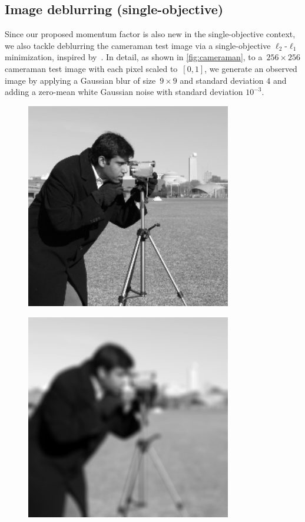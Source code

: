 \documentclass[../main]{subfiles}
\begin{document}
\subsection{Image deblurring (single-objective)}
Since our proposed momentum factor is also new in the single-objective context, we also tackle deblurring the cameraman test image via a single-objective $\ell_2$-$\ell_1$ minimization, inspired by~\cite{Beck2009}.
In detail, as shown in \cref{fig:cameraman}, to a~$256 \times 256$ cameraman test image with each pixel scaled to~$[0,1]$, we generate an observed image by applying a Gaussian blur of size~$9 \times 9$ and standard deviation $4$ and adding a zero-mean white Gaussian noise with standard deviation $10^{-3}$.
\begin{figure}[htpb]
    \centering
    \begin{minipage}[b]{.45\hsize}
        \centering
        \includegraphics[width=0.8\textwidth]{figs/cameraman_original.png}
        \label{fig:cameraman:original}
    \end{minipage}
    \begin{minipage}[b]{.45\hsize}
        \centering
        \includegraphics[width=0.8\textwidth]{figs/cameraman_blurred_and_noisy.png}

\end{minipage}
\end{figure}
\end{document}
